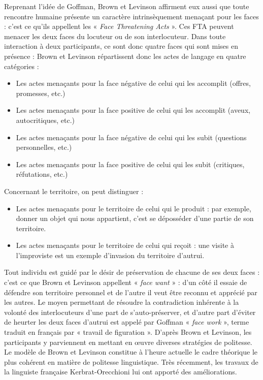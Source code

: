 Reprenant l’idée de Goffman, Brown et Levinson affirment eux aussi que toute rencontre humaine présente un caractère intrinsèquement menaçant pour les faces : c’est ce qu’ils appellent les « \textit{Face Threatening Acts} ». Ces FTA peuvent menacer les deux faces du locuteur ou de son interlocuteur. Dans toute interaction à deux participants, ce sont donc quatre faces qui sont mises en présence : Brown et Levinson répartissent donc les actes de langage en quatre catégories :
\begin{itemize}
\item Les actes menaçants pour la face négative de celui qui les accomplit (offres, promesses, etc.)
\item Les actes menaçants pour la face positive de celui qui les accomplit (aveux, autocritiques, etc.)
\item Les actes menaçants pour la face négative de celui qui les subit (questions personnelles, etc.)
\item Les actes menaçants pour la face positive de celui qui les subit (critiques, réfutations, etc.)
\end{itemize}

Concernant le territoire, on peut distinguer :
\begin{itemize}
\item Les actes menaçants pour le territoire de celui qui le produit : par exemple, donner un objet qui nous appartient, c’est se déposséder d’une partie de son territoire.
\item Les actes menaçants pour le territoire de celui qui reçoit : une visite à l’improviste est un exemple d’invasion du territoire d’autrui.
\end{itemize}

Tout individu est guidé par le désir de préservation de chacune de ses deux faces : c’est ce que Brown et Levinson appellent « \textit{face want} » : d’un côté il essaie de défendre son territoire personnel et de l’autre il veut être reconnu et apprécié par les autres. Le moyen permettant de résoudre la contradiction inhérente à la volonté des interlocuteurs d’une part de s’auto-préserver, et d’autre part d’éviter de heurter les deux faces d’autrui est appelé par Goffman « \textit{face work} », terme traduit en français par « travail de figuration ». D’après Brown et Levinson, les participants y parviennent en mettant en œuvre diverses stratégies de politesse. Le modèle de Brown et Levinson constitue à l’heure actuelle le cadre théorique le plus cohérent en matière de politesse linguistique. Très récemment, les travaux de la linguiste française Kerbrat-Orecchioni lui ont apporté des améliorations.

